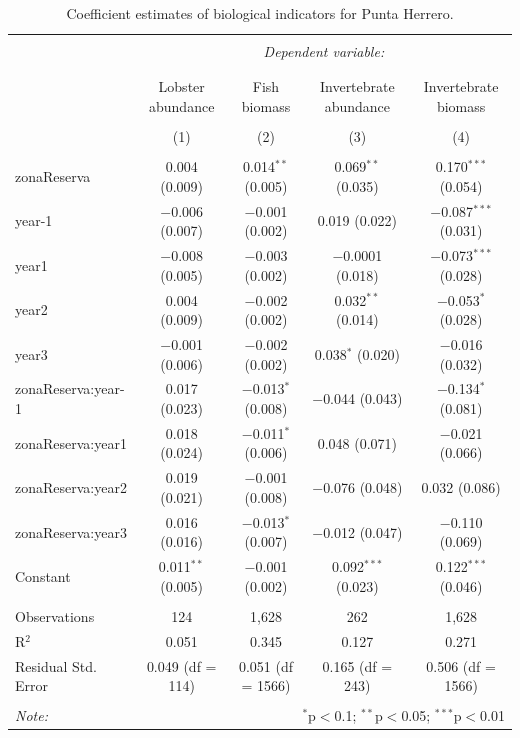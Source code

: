 \documentclass[utf8]{frontiers_suppmat} %
\begin{document}
\clearpage

\begin{table}[!htbp] \centering 
  \caption{Coefficient estimates of biological indicators for Punta Herrero.} 
  \label{} 
\small 
\begin{tabular}{@{\extracolsep{1pt}}lcccc} 
\\[-1.8ex]\hline 
\hline \\[-1.8ex] 
 & \multicolumn{4}{c}{\textit{Dependent variable:}} \\ 
\cline{2-5} 
\\[-1.8ex] & \multicolumn{4}{c}{} \\ 
 & Lobster abundance & Fish biomass & Invertebrate abundance & Invertebrate biomass \\ 
\\[-1.8ex] & (1) & (2) & (3) & (4)\\ 
\hline \\[-1.8ex] 
 zonaReserva & 0.004 (0.009) & 0.014$^{**}$ (0.005) & 0.069$^{**}$ (0.035) & 0.170$^{***}$ (0.054) \\ 
  year-1 & $-$0.006 (0.007) & $-$0.001 (0.002) & 0.019 (0.022) & $-$0.087$^{***}$ (0.031) \\ 
  year1 & $-$0.008 (0.005) & $-$0.003 (0.002) & $-$0.0001 (0.018) & $-$0.073$^{***}$ (0.028) \\ 
  year2 & 0.004 (0.009) & $-$0.002 (0.002) & 0.032$^{**}$ (0.014) & $-$0.053$^{*}$ (0.028) \\ 
  year3 & $-$0.001 (0.006) & $-$0.002 (0.002) & 0.038$^{*}$ (0.020) & $-$0.016 (0.032) \\ 
  zonaReserva:year-1 & 0.017 (0.023) & $-$0.013$^{*}$ (0.008) & $-$0.044 (0.043) & $-$0.134$^{*}$ (0.081) \\ 
  zonaReserva:year1 & 0.018 (0.024) & $-$0.011$^{*}$ (0.006) & 0.048 (0.071) & $-$0.021 (0.066) \\ 
  zonaReserva:year2 & 0.019 (0.021) & $-$0.001 (0.008) & $-$0.076 (0.048) & 0.032 (0.086) \\ 
  zonaReserva:year3 & 0.016 (0.016) & $-$0.013$^{*}$ (0.007) & $-$0.012 (0.047) & $-$0.110 (0.069) \\ 
  Constant & 0.011$^{**}$ (0.005) & $-$0.001 (0.002) & 0.092$^{***}$ (0.023) & 0.122$^{***}$ (0.046) \\ 
 \hline \\[-1.8ex] 
Observations & 124 & 1,628 & 262 & 1,628 \\ 
R$^{2}$ & 0.051 & 0.345 & 0.127 & 0.271 \\ 
Residual Std. Error & 0.049 (df = 114) & 0.051 (df = 1566) & 0.165 (df = 243) & 0.506 (df = 1566) \\ 
\hline 
\hline \\[-1.8ex] 
\textit{Note:}  & \multicolumn{4}{r}{$^{*}$p$<$0.1; $^{**}$p$<$0.05; $^{***}$p$<$0.01} \\ 
\end{tabular} 
\end{table}
\end{document}
